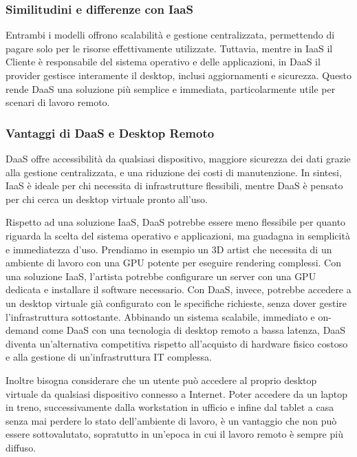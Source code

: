 \documentclass[12pt,a4paper,openright,twoside]{book}
\begin{document}
\subsubsection{Similitudini e differenze con IaaS}
Entrambi i modelli offrono scalabilità e gestione centralizzata, permettendo di pagare solo per le risorse effettivamente utilizzate. Tuttavia, mentre in \ac{IaaS} il Cliente è responsabile del sistema operativo e delle applicazioni, in DaaS il provider gestisce interamente il desktop, inclusi aggiornamenti e sicurezza. Questo rende DaaS una soluzione più semplice e immediata, particolarmente utile per scenari di lavoro remoto.

\subsubsection{Vantaggi di DaaS e Desktop Remoto}
DaaS offre accessibilità da qualsiasi dispositivo, maggiore sicurezza dei dati grazie alla gestione centralizzata, e una riduzione dei costi di manutenzione. In sintesi, \ac{IaaS} è ideale per chi necessita di infrastrutture flessibili, mentre DaaS è pensato per chi cerca un desktop virtuale pronto all'uso.

Rispetto ad una soluzione \ac{IaaS}, DaaS potrebbe essere meno flessibile per quanto riguarda la scelta del sistema operativo e applicazioni, ma guadagna in semplicità e immediatezza d'uso.
Prendiamo in esempio un 3D artist che necessita di un ambiente di lavoro con una GPU potente per eseguire rendering complessi. Con una soluzione \ac{IaaS}, l'artista potrebbe configurare un server con una GPU dedicata e installare il software necessario. Con DaaS, invece, potrebbe accedere a un desktop virtuale già configurato con le specifiche richieste, senza dover gestire l'infrastruttura sottostante.
Abbinando un sistema scalabile, immediato e on-demand come DaaS con una tecnologia di desktop remoto a bassa latenza, DaaS diventa un'alternativa competitiva rispetto all'acquisto di hardware fisico costoso e alla gestione di un'infrastruttura IT complessa.

Inoltre bisogna considerare che un utente può accedere al proprio desktop virtuale da qualsiasi dispositivo connesso a Internet.
Poter accedere da un laptop in treno, successivamente dalla workstation in ufficio e infine dal tablet a casa senza mai perdere lo stato dell'ambiente di lavoro, è un vantaggio che non può essere sottovalutato, sopratutto in un'epoca in cui il lavoro remoto è sempre più diffuso.
\end{document}
